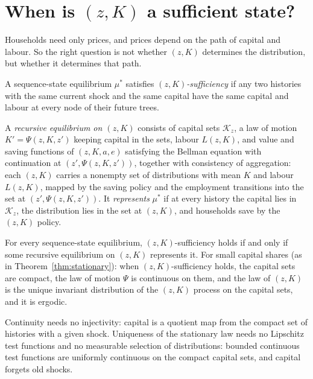 \section{When is $(z,K)$ a sufficient state?}\label{sec:aggregate}

Households need only prices, and prices depend on the path of capital and labour. So the right
question is not whether $(z,K)$ determines the distribution, but whether it determines that path.

\begin{definition}
A sequence-state equilibrium $\mu^*$ satisfies \emph{$(z,K)$-sufficiency} if any two histories with
the same current shock and the same capital have the same capital and labour at every node of their
future trees.
\end{definition}

\noindent
A \emph{recursive equilibrium on $(z,K)$} consists of capital sets $\mathcal K_z$, a law of motion
$K'=\Psi(z,K,z')$ keeping capital in the sets, labour $L(z,K)$, and value and saving functions of
$(z,K,a,e)$ satisfying the Bellman equation with continuation at $(z',\Psi(z,K,z'))$, together with
consistency of aggregation: each $(z,K)$ carries a nonempty set of distributions with mean $K$ and
labour $L(z,K)$, mapped by the saving policy and the employment transitions into the set at
$(z',\Psi(z,K,z'))$. It \emph{represents} $\mu^*$ if at every history the capital lies in
$\mathcal K_z$, the distribution lies in the set at $(z,K)$, and households save by the $(z,K)$
policy.

\begin{theorem}\label{thm:iff}
For every sequence-state equilibrium, $(z,K)$-sufficiency holds if and only if some recursive
equilibrium on $(z,K)$ represents it. For small capital shares (as in Theorem~\ref{thm:stationary}):
when $(z,K)$-sufficiency holds, the capital sets are compact, the law of motion $\Psi$ is continuous
on them, and the law of $(z,K)$ is the unique invariant distribution of the $(z,K)$ process on the
capital sets, and it is ergodic.
\end{theorem}

\noindent
Continuity needs no injectivity: capital is a quotient map from the compact set of histories with a
given shock. Uniqueness of the stationary law needs no Lipschitz test functions and no measurable
selection of distributions: bounded continuous test functions are uniformly continuous on the
compact capital sets, and capital forgets old shocks.

